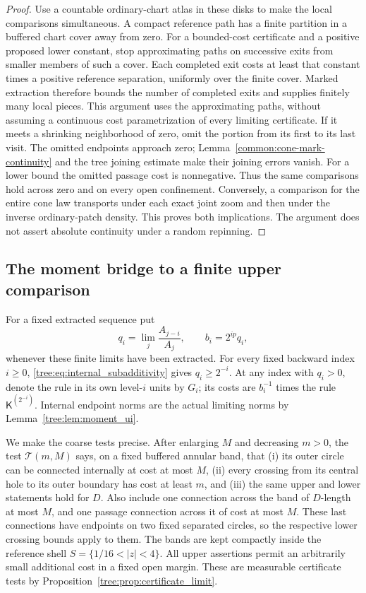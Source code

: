 \begin{proof}
Use a countable ordinary-chart atlas in these disks to make the local
comparisons simultaneous. A compact reference path has a finite
partition in a buffered chart cover away from zero. For a bounded-cost
certificate and a positive proposed lower constant, stop approximating
paths on successive exits from smaller members of such a cover. Each
completed exit costs at least that constant times a positive reference
separation, uniformly over the finite cover. Marked extraction therefore
bounds the number of completed exits and supplies finitely many local
pieces. This argument uses the approximating paths, without assuming
a continuous cost parametrization of every limiting certificate.
If it meets a shrinking neighborhood of zero, omit the portion from
its first to its last visit. The omitted endpoints approach zero;
Lemma~\ref{common:cone-mark-continuity} and the tree joining estimate make their joining
errors vanish. For a lower bound the omitted passage cost is
nonnegative. Thus the same comparisons hold across zero and on every
open confinement. Conversely, a comparison for the entire cone law
transports under each exact joint zoom and then under the inverse
ordinary-patch density. This proves both implications. The argument does not assert
absolute continuity under a random repinning.
\end{proof}


\subsection{The moment bridge to a finite upper comparison}

For a fixed extracted sequence put
\[
 q_i=\lim_j\frac{A_{j-i}}{A_j},\qquad b_i=2^{ip}q_i,
\]
whenever these finite limits have been extracted. For every fixed
backward index $i\geq0$, \eqref{tree:eq:internal_subadditivity} gives
$q_i\geq2^{-i}$. At any index with $q_i>0$, denote the rule in its own level-$i$ units by $G_i$;
its costs are $b_i^{-1}$ times the rule $\mathsf K^{(2^{-i})}$.
Internal endpoint norms are the actual limiting norms by
Lemma~\ref{tree:lem:moment_ui}.

We make the coarse tests precise.  After enlarging $M$ and decreasing
$m>0$, the test $\mathcal T(m,M)$ says, on a fixed buffered annular
band, that (i) its outer circle can be connected internally at cost at
most $M$, (ii) every crossing from its central hole to its outer
boundary has cost at least $m$, and (iii) the same upper and lower
statements hold for $D$.  Also include one connection across the band
of $D$-length at most $M$, and one passage connection across it of
cost at most $M$.  These last connections have endpoints on two
fixed separated circles, so the respective lower crossing bounds
apply to them. The bands are kept compactly inside the reference shell
$S=\{1/16<|z|<4\}$.
All upper assertions permit an arbitrarily small additional cost in
a fixed open margin.  These are measurable certificate tests by
Proposition~\ref{tree:prop:certificate_limit}.

